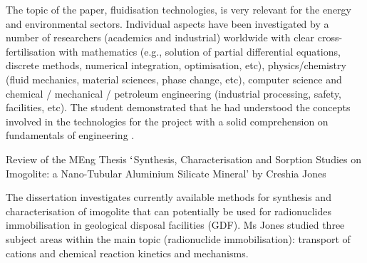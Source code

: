 \documentclass[14pt,twoside]{report}
\begin{document}
The topic of the paper, fluidisation technologies, is very relevant for the energy and environmental sectors. Individual aspects have been investigated by a number of researchers (academics and industrial) worldwide with clear cross-fertilisation with mathematics (e.g., solution of partial differential equations, discrete methods, numerical integration, optimisation, etc), physics/chemistry (fluid mechanics, material sciences, phase change, etc), computer science  and chemical / mechanical / petroleum engineering (industrial processing, safety, facilities, etc). The student demonstrated that he had understood the concepts involved in the technologies for the project with a solid comprehension on fundamentals of engineering .    



\clearpage



\bigskip

\begin{center}
  {\Large Review of the MEng Thesis $\lq$Synthesis, Characterisation and Sorption Studies on Imogolite: a Nano-Tubular Aluminium Silicate Mineral' by Creshia Jones}
\end{center}

\medskip

The dissertation investigates currently available methods for synthesis and characterisation of imogolite that can potentially be used for radionuclides immobilisation in geological disposal facilities (GDF). Ms Jones studied three subject areas within the main topic (radionuclide immobilisation): transport of cations and chemical reaction kinetics and mechanisms.  
\end{document}
